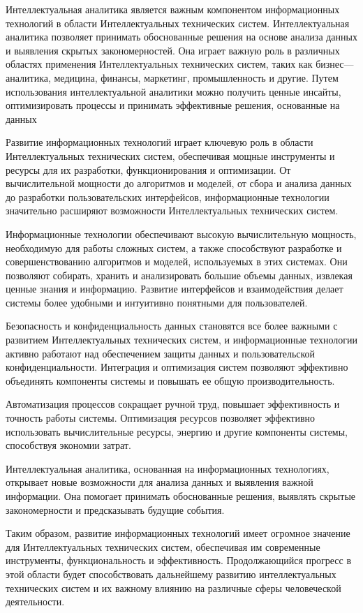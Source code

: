     Интеллектуальная аналитика является важным компонентом информационных технологий в области Интеллектуальных технических систем. Интеллектуальная аналитика позволяет принимать обоснованные решения на основе анализа данных и выявления скрытых закономерностей. Она играет важную роль в различных областях применения Интеллектуальных технических систем, таких как бизнес—аналитика, медицина, финансы, маркетинг, промышленность и другие. Путем использования интеллектуальной аналитики можно получить ценные инсайты, оптимизировать процессы и принимать эффективные решения, основанные на данных
    
    Развитие информационных технологий играет ключевую роль в области Интеллектуальных технических систем, обеспечивая мощные инструменты и ресурсы для их разработки, функционирования и оптимизации. От вычислительной мощности до алгоритмов и моделей, от сбора и анализа данных до разработки пользовательских интерфейсов, информационные технологии значительно расширяют возможности Интеллектуальных технических систем.
    
    Информационные технологии обеспечивают высокую вычислительную мощность, необходимую для работы сложных систем, а также способствуют разработке и совершенствованию алгоритмов и моделей, используемых в этих системах. Они позволяют собирать, хранить и анализировать большие объемы данных, извлекая ценные знания и информацию. Развитие интерфейсов и взаимодействия делает системы более удобными и интуитивно понятными для пользователей.
    
    Безопасность и конфиденциальность данных становятся все более важными с развитием Интеллектуальных технических систем, и информационные технологии активно работают над обеспечением защиты данных и пользовательской конфиденциальности. Интеграция и оптимизация систем позволяют эффективно объединять компоненты системы и повышать ее общую производительность.
    
    Автоматизация процессов сокращает ручной труд, повышает эффективность и точность работы системы. Оптимизация ресурсов позволяет эффективно использовать вычислительные ресурсы, энергию и другие компоненты системы, способствуя экономии затрат.
    
    Интеллектуальная аналитика, основанная на информационных технологиях, открывает новые возможности для анализа данных и выявления важной информации. Она помогает принимать обоснованные решения, выявлять скрытые закономерности и предсказывать будущие события.
    
    Таким образом, развитие информационных технологий имеет огромное значение для Интеллектуальных технических систем, обеспечивая им современные инструменты, функциональность и эффективность. Продолжающийся прогресс в этой области будет способствовать дальнейшему развитию интеллектуальных технических систем и их важному влиянию на различные сферы человеческой деятельности.
    
